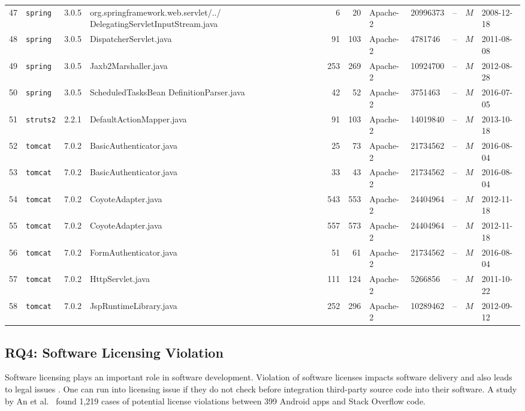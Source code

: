 \documentclass{sig-alternate-05-2015}
\begin{document}
\begin{table}
{\begin{tabular}{r|l|c|p{4.5cm}|r|r|l|l|l|c|l}
			47 & \texttt{spring} & 3.0.5  & org.springframework.web.servlet/../ \newline DelegatingServletInputStream.java  & 6 & 20 & Apache-2 & 20996373 & -- & $M$  & 2008-12-18 \\
			48 & \texttt{spring} & 3.0.5  & DispatcherServlet.java  & 91 & 103 & Apache-2 & 4781746 & -- & $M$  & 2011-08-08 \\
			49 & \texttt{spring} & 3.0.5  & Jaxb2Marshaller.java  & 253 & 269 & Apache-2 & 10924700 & -- & $M$  & 2012-08-28 \\
			50 & \texttt{spring} & 3.0.5  & ScheduledTasksBean \newline DefinitionParser.java  & 42 & 52 & Apache-2 & 3751463 & -- & $M$  & 2016-07-05 \\
			51 & \texttt{struts2} & 2.2.1  & DefaultActionMapper.java  & 91 & 103 & Apache-2 & 14019840 & -- & $M$  & 2013-10-18 \\
			52 & \texttt{tomcat} & 7.0.2  & BasicAuthenticator.java  & 25 & 73 & Apache-2 & 21734562 & -- & $M$  & 2016-08-04 \\
			53 & \texttt{tomcat} & 7.0.2  & BasicAuthenticator.java  & 33 & 43 & Apache-2 & 21734562 & -- & $M$  & 2016-08-04 \\
			54 & \texttt{tomcat} & 7.0.2  & CoyoteAdapter.java  & 543 & 553 & Apache-2 & 24404964 & -- & $M$  & 2012-11-18 \\
			55 & \texttt{tomcat} & 7.0.2  & CoyoteAdapter.java  & 557 & 573 & Apache-2 & 24404964 & -- & $M$  & 2012-11-18 \\
			56 & \texttt{tomcat} & 7.0.2  & FormAuthenticator.java  & 51 & 61 & Apache-2 & 21734562 & -- & $M$  & 2016-08-04 \\
			57 & \texttt{tomcat} & 7.0.2  & HttpServlet.java  & 111 & 124 & Apache-2 & 5266856 & -- & $M$  & 2011-10-22 \\
			58 & \texttt{tomcat} & 7.0.2  & JspRuntimeLibrary.java  & 252 & 296 & Apache-2 & 10289462 & -- & $M$  & 2012-09-12 \\
		\hline
	\end{tabular} %
}
\end{table}

\subsection{RQ4: Software Licensing Violation}
Software licensing plays an important role in software development. Violation of software licenses impacts software delivery and also leads to legal issues \cite{Sprigman2015}. 
One can run into licensing issue if they do not check before integration third-party source code into their software. A study by An et al.~\cite{An2017} found 1,219 cases of potential license violations between 399 Android apps and Stack Overflow code. %
\end{document}
